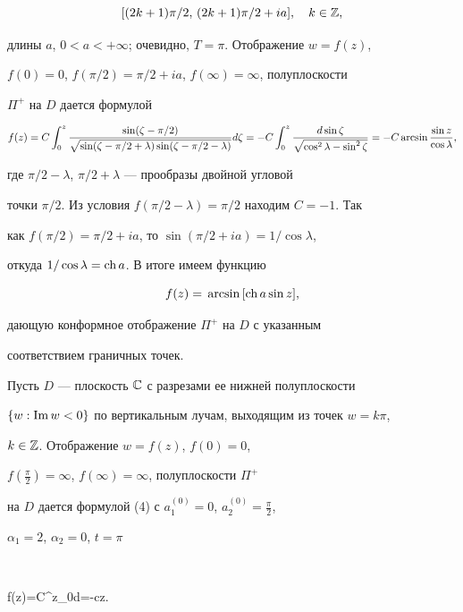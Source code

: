 $$ 


[(2k+1)\pi/2,\,(2k+1)\pi/2+i a],\quad k\in\Bbb Z, 


$$ 


длины $a$, $0<a<+\infty$; очевидно, $T=\pi$. Отображение $w=f(z)$, 


$f(0)=0$, $f(\pi/2)=\pi/2+i a$, $f(\infty)=\infty$, полуплоскости 


$\Pi^+$ на $D$ дается формулой 


$$ 


f(z)=C\int^z_0\frac{\sin(\zeta-\pi/2)} 


{\sqrt{\sin(\zeta-\pi/2+\lambda)\sin(\zeta-\pi/2-\lambda)}}d\zeta= 


-C\int^z_0\frac{d\sin\zeta} 


{\sqrt{\cos^2\lambda-\sin^2\zeta}}= 


-C\text{\,arcsin\,}\frac{\sin z}{\cos\lambda}, 


$$ 


где $\pi/2-\lambda$, $\pi/2+\lambda$ --- прообразы двойной угловой 


точки $\pi/2$. Из условия $f(\pi/2-\lambda)=\pi/2$ находим $C=-1$. Так 


как $f(\pi/2)=\pi/2+ia$, то $\sin(\pi/2+i a)=1/\cos\lambda$, 


откуда $1/\cos\lambda=\text{ch\,}a$. В итоге имеем функцию 


$$


f(z)=\text{\,arcsin\,}[\text{ch\,}a\sin z],


$$


дающую конформное отображение $\Pi^+$ на $D$ с указанным


соответствием граничных точек.





Пусть $D$ --- плоскость $\Bbb C$ с разрезами ее нижней полуплоскости


$\{w:\operatorname{Im} w<0\}$ по вертикальным лучам, выходящим из точек $w=k\pi$,


$k\in\Bbb Z$. Отображение $w=f(z)$, $f(0)=0$,


$f(\frac{\pi}{2})=\infty$, $f(\infty)=\infty$, полуплоскости $\Pi^+$


на $D$ дается формулой (4) с $a^{(0)}_1=0$, $a^{(0)}_2=\frac{\pi}{2}$,


$\alpha_1=2$, $\alpha_2=0$, $t=\pi$


$$


f(z)=C\int^z_0\frac{\sin\zeta}{\cos\zeta}d\zeta=-c\ln\cos z.



